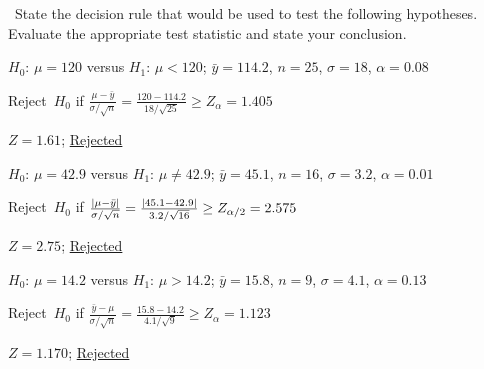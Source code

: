 \begin{problem}
  ~State the decision rule that would be used to test the following hypotheses.  Evaluate the appropriate test statistic and state your conclusion.
\end{problem}

\begin{subproblem}
  $H_0$: ${\mu = 120}$ versus $H_1$: ${\mu < 120}$; ${\bar{y} = 114.2}$, ${n = 25}$, ${\sigma = 18}$, ${\alpha = 0.08}$
\end{subproblem}

\noindent
Reject~$H_0$ if ${\frac{\mu - \bar{y}}{\sigma / \sqrt{n}} = \frac{120 - 114.2}{18 / \sqrt{25}} \geq Z_{\alpha} = 1.405}$

\noindent
${Z = 1.61}$; \underline{Rejected}

\begin{subproblem}
  $H_0$: ${\mu = 42.9}$ versus $H_1$: ${\mu \ne 42.9}$; ${\bar{y} = 45.1}$, ${n = 16}$, ${\sigma = 3.2}$, ${\alpha = 0.01}$
\end{subproblem}

\noindent
Reject~$H_0$ if ${\frac{\lvert\mu - \bar{y}\rvert}{\sigma / \sqrt{n}} = \frac{\lvert45.1 - 42.9\rvert}{3.2 / \sqrt{16}} \geq Z_{\alpha/2} = 2.575}$

\noindent
${Z = 2.75}$; \underline{Rejected}

\begin{subproblem}
  $H_0$: ${\mu = 14.2}$ versus $H_1$: ${\mu > 14.2}$; ${\bar{y} = 15.8}$, ${n = 9}$, ${\sigma = 4.1}$, ${\alpha = 0.13}$
\end{subproblem}

\noindent
Reject~$H_0$ if ${\frac{\bar{y} - \mu}{\sigma / \sqrt{n}} = \frac{15.8 - 14.2}{4.1 / \sqrt{9}} \geq Z_{\alpha} = 1.123}$

\noindent
${Z = 1.170}$; \underline{Rejected}
